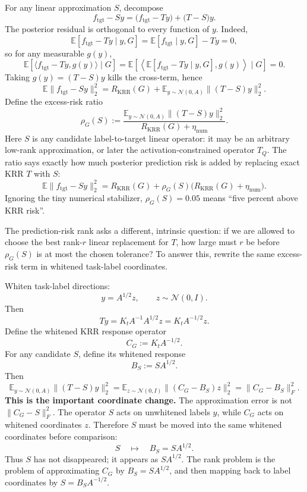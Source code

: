 \documentclass[11pt]{article}
\begin{document}
For any linear approximation \(S\), decompose
\[
f_{\mathrm{tgt}}-Sy
=
\bigl(f_{\mathrm{tgt}}-Ty\bigr)
+
\bigl(T-S\bigr)y.
\]
The posterior residual is orthogonal to every function of \(y\). Indeed,
\[
\mathbb{E}\!\left[f_{\mathrm{tgt}}-Ty\mid y,G\right]
=
\mathbb{E}[f_{\mathrm{tgt}}\mid y,G]-Ty
=0,
\]
so for any measurable \(g(y)\),
\[
\mathbb{E}\left[\langle f_{\mathrm{tgt}}-Ty,g(y)\rangle\mid G\right]
=
\mathbb{E}\left[
\left\langle
\mathbb{E}[f_{\mathrm{tgt}}-Ty\mid y,G],g(y)
\right\rangle
\mid G
\right]
=0.
\]
Taking \(g(y)=(T-S)y\) kills the cross-term, hence
\[
\mathbb{E}\|f_{\mathrm{tgt}}-Sy\|_2^2
=
R_{\mathrm{KRR}}(G)
+
\mathbb{E}_{y\sim\mathcal{N}(0,A)}\|(T-S)y\|_2^2.
\]
Define the excess-risk ratio
\[
\rho_G(S)
:=
\frac{
\mathbb{E}_{y\sim\mathcal{N}(0,A)}\|(T-S)y\|_2^2
}{
R_{\mathrm{KRR}}(G)+\eta_{\mathrm{num}}
}.
\]
Here \(S\) is any candidate label-to-target linear operator: it may be an arbitrary low-rank
approximation, or later the activation-constrained operator \(T_Q\). The ratio says exactly how much
posterior prediction risk is added by replacing exact KRR \(T\) with \(S\):
\[
\mathbb{E}\|f_{\mathrm{tgt}}-Sy\|_2^2
=
R_{\mathrm{KRR}}(G)
+\rho_G(S)\bigl(R_{\mathrm{KRR}}(G)+\eta_{\mathrm{num}}\bigr).
\]
Ignoring the tiny numerical stabilizer, \(\rho_G(S)=0.05\) means ``five percent above KRR risk''.

The prediction-risk rank asks a different, intrinsic question: if we are allowed to choose the best
rank-\(r\) linear replacement for \(T\), how large must \(r\) be before \(\rho_G(S)\) is at most the
chosen tolerance? To answer this, rewrite the same excess-risk term in whitened task-label
coordinates.

Whiten task-label directions:
\[
y=A^{1/2}z,\qquad z\sim\mathcal{N}(0,I).
\]
Then
\[
Ty=K_tA^{-1}A^{1/2}z
=K_tA^{-1/2}z.
\]
Define the whitened KRR response operator
\[
C_G:=K_tA^{-1/2}.
\]
For any candidate \(S\), define its whitened response
\[
B_S:=SA^{1/2}.
\]
Then
\[
\mathbb{E}_{y\sim\mathcal{N}(0,A)}\|(T-S)y\|_2^2
=
\mathbb{E}_{z\sim\mathcal{N}(0,I)}\|(C_G-B_S)z\|_2^2
=
\|C_G-B_S\|_F^2.
\]
\textbf{This is the important coordinate change.} The approximation error is not
\(\|C_G-S\|_F^2\). The operator \(S\) acts on unwhitened labels \(y\), while \(C_G\) acts on
whitened coordinates \(z\). Therefore \(S\) must be moved into the same whitened coordinates before
comparison:
\[
S\quad\longmapsto\quad B_S=SA^{1/2}.
\]
Thus \(S\) has not disappeared; it appears as \(SA^{1/2}\). The rank problem is the problem of
approximating \(C_G\) by \(B_S=SA^{1/2}\), and then mapping back to label coordinates by
\(S=B_SA^{-1/2}\).
\end{document}
